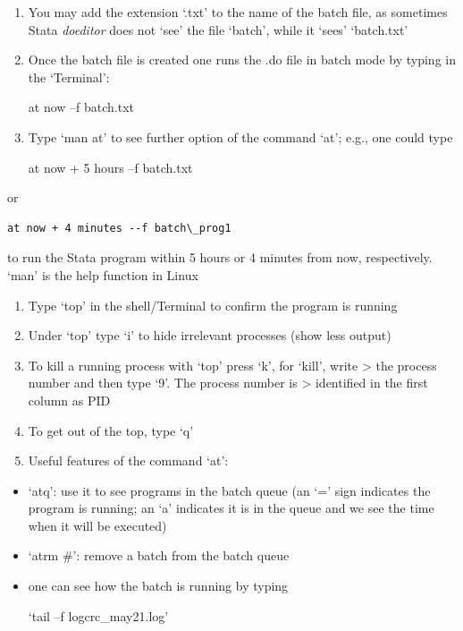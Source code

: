 \documentclass[]{book}
\begin{document}
\begin{enumerate}
\def\labelenumi{\arabic{enumi}.}
\setcounter{enumi}{6}
\item
  You may add the extension `.txt' to the name of the batch file, as
  sometimes Stata \emph{doeditor} does not `see' the file `batch', while
  it `sees' `batch.txt'
\item
  Once the batch file is created one runs the .do file in batch mode
  by typing in the `Terminal':

  at now --f batch.txt
\item
  Type `man at' to see further option of the command `at'; e.g., one
  could type

  at now + 5 hours --f batch.txt
\end{enumerate}

or

\begin{verbatim}
at now + 4 minutes --f batch\_prog1
\end{verbatim}

to run the Stata program within 5 hours or 4 minutes from now,
respectively. `man' is the help function in Linux

\begin{enumerate}
\def\labelenumi{\arabic{enumi}.}
\setcounter{enumi}{9}
\item
  Type `top' in the shell/Terminal to confirm the program is running
\item
  Under `top' type `i' to hide irrelevant processes (show less output)
\item
  To kill a running process with `top' press `k', for `kill', write
  \textgreater{} the process number and then type `9'. The process number is
  \textgreater{} identified in the first column as PID
\item
  To get out of the top, type `q'
\item
  Useful features of the command `at':
\end{enumerate}

\begin{itemize}
\item
  `atq': use it to see programs in the batch queue (an `=' sign
  indicates the program is running; an `a' indicates it is in
  the queue and we see the time when it will be executed)
\item
  `atrm \#': remove a batch from the batch queue
\item
  one can see how the batch is running by typing

  `tail --f logcrc\_may21.log'
\end{itemize}
\end{document}

